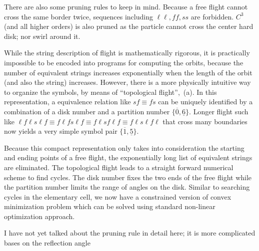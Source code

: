 There are also some pruning rules to keep in mind. Because a free
flight cannot cross the same border twice, sequences including
$\ell\ell,ff,ss$ are forbidden. $C^3$ (and all higher orders) is also
pruned as the particle cannot cross the center hard disk; nor swirl
around it.

While the string description of flight is mathematically rigorous, it
is practically impossible to be encoded into programs for computing
the orbits, because the number of equivalent strings increases
exponentially when the length of the orbit (and also the string)
increases. However, there is a more physically intuitive way to
organize the symbols, by means of ``topological flight'',
\,(a). In this representation, a equivalence
relation like $sf\equiv fs$ can be uniquely identified by a
combination of a disk number and a partition number
$\{\overline{0},\underline{6}\}$. Longer flight such like $\ell f \ell
s \ell f \equiv  f \ell f s \ell f \equiv f \ell s f \ell f \equiv f
\ell s \ell f \ell$ that cross many boundaries now yields a very
simple symbol pair $\{\overline{1},\underline{5}\}$.

Because this compact representation only takes into consideration the
starting and ending points of a free flight, the exponentially long
list of equivalent strings are eliminated. The topological flight
leads to a straight forward numerical scheme to find cycles. The disk
number fixes the two ends of the free flight while the partition
number limits the range of angles on the disk. Similar to searching
cycles in the elementary cell, we now have a constrained version of
convex minimization problem which can be solved using standard
non-linear optimization approach.

    {I have not yet talked about the pruning rule in detail here; it is
    more complicated bases on the reflection angle}
